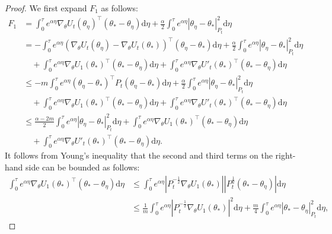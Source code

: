 \documentclass[11pt]{article}
\theoremstyle{plain}
\theoremstyle{definition}
\theoremstyle{remark}
\begin{document}
\begin{proof}
We first expand $F_1$ as follows:
\begin{equation}\nonumber
\begin{split}
    F_1 &= \int_0^\tau e^{\alpha \eta}\nabla_{\theta}U_t(\theta_\eta)^{\top}(\theta_*-\theta_\eta)\mathrm{d}\eta + \frac{\alpha}{2}\int_0^\tau e^{\alpha \eta}|\theta_\eta-\theta_*|^2_{P_t} \mathrm{d}\eta\\
    &=- \int_0^\tau e^{\alpha \eta}(\nabla_{\theta}U_t(\theta_\eta)-\nabla_{\theta}U_t(\theta_*))^{\top}(\theta_\eta-\theta_*)\mathrm{d}\eta + \frac{\alpha}{2}\int_0^\tau e^{\alpha \eta}|\theta_\eta-\theta_*|_{P_t}^2 \mathrm{d}\eta \\
    &  \quad +\int_0^\tau e^{\alpha \eta}\nabla_{\theta}U_1(\theta_*)^{\top}(\theta_*-\theta_\eta)\mathrm{d}\eta+  \int_0^\tau e^{\alpha \eta} \nabla_{\theta} U'_t(\theta_*)^{\top}(\theta_*-\theta_\eta)\mathrm{d}\eta\\
    &\leq -m \int_0^\tau e^{\alpha \eta}(\theta_\eta-\theta_*)^{\top}P_t(\theta_\eta-\theta_*)\mathrm{d}\eta + \frac{\alpha}{2}\int_0^\tau e^{\alpha \eta}|\theta_\eta-\theta_*|_{P_t}^2 \mathrm{d}\eta\\
    & \quad  +\int_0^\tau e^{\alpha \eta}\nabla_{\theta}U_1(\theta_*)^{\top}(\theta_*-\theta_\eta)\mathrm{d}\eta+ \int_0^\tau e^{\alpha \eta} \nabla_{\theta} U'_t(\theta_*)^{\top}(\theta_*-\theta_\eta)\mathrm{d}\eta\\
    &\leq \frac{\alpha-2m}{2}\int_0^\tau e^{\alpha \eta}|\theta_\eta-\theta_*|_{P_t}^2 \mathrm{d}\eta +  \int_0^\tau e^{\alpha \eta} \nabla_{\theta} U_1(\theta_*)^{\top}(\theta_*-\theta_\eta)\mathrm{d}\eta\\
    &\quad + \int_0^\tau e^{\alpha \eta} \nabla_{\theta} U'_t(\theta_*)^{\top}(\theta_*-\theta_\eta)\mathrm{d}\eta.
\end{split}
\end{equation}
It follows from Young's inequality that the second and third terms on the right-hand side can be bounded as follows:
\begin{equation*}
\begin{split}
    \int_0^\tau e^{\alpha \eta} \nabla_{\theta} U_1(\theta_*)^{\top}(\theta_*-\theta_\eta)\mathrm{d}\eta &\leq \int_0^\tau e^{\alpha \eta}|P_t^{-\frac{1}{2}}\nabla_{\theta} U_1(\theta_*)||P_t^{\frac{1}{2}}(\theta_*-\theta_\eta)|\mathrm{d}\eta\\
    & \leq \frac{1}{m}\int_0^\tau e^{\alpha \eta}|P_t^{-\frac{1}{2}}\nabla_{\theta} U_1(\theta_*)|^2 \mathrm{d}\eta +\frac{m}{4}\int_0^\tau e^{\alpha \eta}|\theta_*-\theta_\eta|_{P_t}^2 \mathrm{d}\eta,

\end{split}
\end{equation*}
\end{proof}
\end{document}
